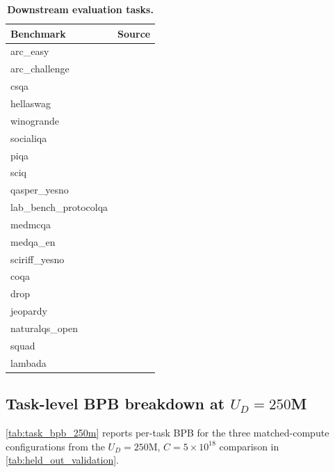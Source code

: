 \begin{table}[t]
    \centering
    \caption{\textbf{Downstream evaluation tasks.}}
    \label{tab:task_inventory}
    \begin{tabular}{ll}
        \toprule
        Benchmark & Source \\
        \midrule
        arc\_easy & \citet{allenai:arc}\\
        arc\_challenge & \citet{allenai:arc}\\
        csqa & \citet{talmor2019commonsenseqa}\\
        hellaswag & \citet{zellers2019hellaswag}\\
        winogrande & \citet{sakaguchi2021winogrande} \\
        socialiqa & \citet{sap2019social}\\
        piqa & \citet{bisk2020piqa}\\
        sciq & \citet{welbl2017crowdsourcing} \\
        qasper\_yesno & \citet{dasigi2021dataset} \\
        lab\_bench\_protocolqa & \citet{laurent2024lab} \\
        medmcqa & \citet{pal2022medmcqa} \\
        medqa\_en & \citet{jin2021disease}\\
        sciriff\_yesno & \citet{wadden2025sciriff} \\
        coqa & \citet{reddy2019coqa} \\
        drop & \citet{dua2019drop} \\
        jeopardy & \citet{kaggle200000jeopardy} \\
        naturalqs\_open & \citet{kwiatkowski-etal-2019-natural} \\
        squad & \citet{rajpurkar2016squad} \\
        lambada & \citet{paperno2016lambada} \\
        \bottomrule
    \end{tabular}
\end{table}


\subsection{Task-level BPB breakdown at $U_D = 250$M}

\autoref{tab:task_bpb_250m} reports per-task BPB for the three matched-compute configurations from the $U_D = 250$M, $C = 5 \times 10^{18}$ comparison in \autoref{tab:held_out_validation}. 

